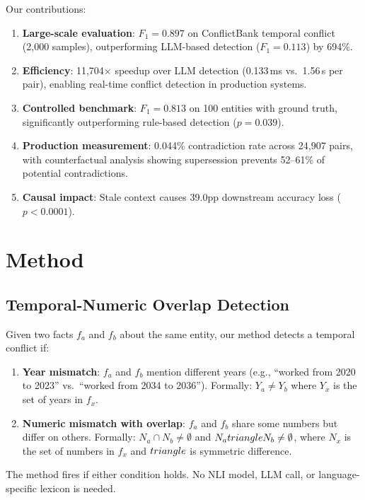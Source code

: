 \documentclass{article}
\begin{document}
Our contributions:
\begin{enumerate}
\item \textbf{Large-scale evaluation}: $F_1 = 0.897$ on ConflictBank temporal conflict (2{,}000 samples), outperforming LLM-based detection ($F_1 = 0.113$) by 694\%.
\item \textbf{Efficiency}: 11{,}704$\times$ speedup over LLM detection (0.133\,ms vs.\ 1.56\,s per pair), enabling real-time conflict detection in production systems.
\item \textbf{Controlled benchmark}: $F_1 = 0.813$ on 100 entities with ground truth, significantly outperforming rule-based detection ($p = 0.039$).
\item \textbf{Production measurement}: 0.044\% contradiction rate across 24{,}907 pairs, with counterfactual analysis showing supersession prevents 52--61\% of potential contradictions.
\item \textbf{Causal impact}: Stale context causes 39.0pp downstream accuracy loss ($p < 0.0001$).
\end{enumerate}

\section{Method}

\subsection{Temporal-Numeric Overlap Detection}

Given two facts $f_a$ and $f_b$ about the same entity, our method detects a temporal conflict if:

\begin{enumerate}
\item \textbf{Year mismatch}: $f_a$ and $f_b$ mention different years (e.g., ``worked from 2020 to 2023'' vs.\ ``worked from 2034 to 2036''). Formally: $Y_a \neq Y_b$ where $Y_x$ is the set of years in $f_x$.
\item \textbf{Numeric mismatch with overlap}: $f_a$ and $f_b$ share some numbers but differ on others. Formally: $N_a \cap N_b \neq \emptyset$ and $N_a \\triangle  N_b \neq \emptyset$, where $N_x$ is the set of numbers in $f_x$ and $\\triangle $ is symmetric difference.
\end{enumerate}

The method fires if either condition holds. No NLI model, LLM call, or language-specific lexicon is needed.
\end{document}
